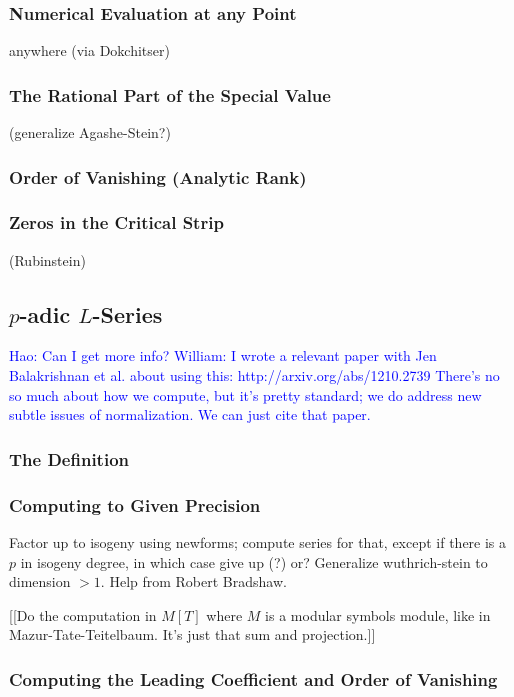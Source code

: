 \documentclass{article}
\newcommand{\Hao}[1]{\textcolor{blue}{\textsf{Hao: #1}}}
\newcommand{\wstein}[1]{\textcolor{blue}{\textsf{William: #1}}}
\begin{document}
\subsubsection{Numerical Evaluation at any Point}
 anywhere (via Dokchitser)

\subsubsection{The Rational Part of the Special Value}
 (generalize Agashe-Stein?)

\subsubsection{Order of Vanishing (Analytic Rank)}

\subsubsection{Zeros in the Critical Strip}
 (Rubinstein)

\subsection{$p$-adic $L$-Series}

\Hao{Can I get more info?}
\wstein{I wrote a relevant paper with Jen Balakrishnan et al. about using this: http://arxiv.org/abs/1210.2739    There's no so much about how we compute, but it's pretty standard; we do address new subtle issues of
normalization.  We can just cite that paper.}


\subsubsection{The Definition}

\subsubsection{Computing to Given Precision}
Factor up to isogeny using newforms; compute series for that,
except if there is a $p$ in isogeny degree, in which case give up (?) or?
Generalize wuthrich-stein to dimension $>1$.  Help from Robert Bradshaw.

[[Do the computation in $M[T]$ where $M$ is a modular symbols module, like
in Mazur-Tate-Teitelbaum.  It's just that sum and projection.]]

\subsubsection{Computing the Leading Coefficient and Order of Vanishing}
\end{document}
